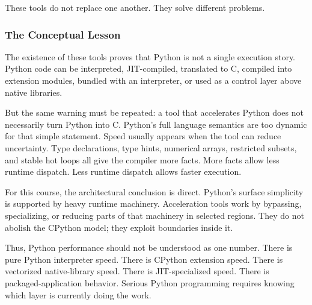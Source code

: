 These tools do not replace one another. They solve different problems.

\subsubsection{The Conceptual Lesson}

The existence of these tools proves that Python is not a single execution story. Python code can be interpreted, JIT-compiled, translated to C, compiled into extension modules, bundled with an interpreter, or used as a control layer above native libraries.

But the same warning must be repeated: a tool that accelerates Python does not necessarily turn Python into C. Python's full language semantics are too dynamic for that simple statement. Speed usually appears when the tool can reduce uncertainty. Type declarations, type hints, numerical arrays, restricted subsets, and stable hot loops all give the compiler more facts. More facts allow less runtime dispatch. Less runtime dispatch allows faster execution.

For this course, the architectural conclusion is direct. Python's surface simplicity is supported by heavy runtime machinery. Acceleration tools work by bypassing, specializing, or reducing parts of that machinery in selected regions. They do not abolish the CPython model; they exploit boundaries inside it.

Thus, Python performance should not be understood as one number. There is pure Python interpreter speed. There is CPython extension speed. There is vectorized native-library speed. There is JIT-specialized speed. There is packaged-application behavior. Serious Python programming requires knowing which layer is currently doing the work.